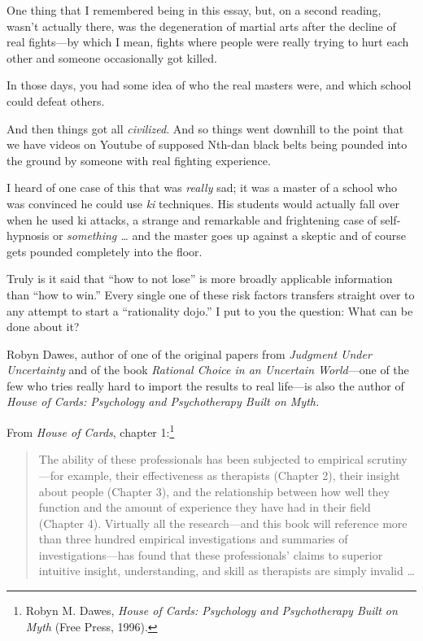 {
 One thing that I remembered being in this essay, but, on a second
reading, wasn't actually there, was the degeneration of
martial arts after the decline of real fights---by which I mean, fights
where people were really trying to hurt each other and someone
occasionally got killed.}

{
 In those days, you had some idea of who the real masters were, and
which school could defeat others.}

{
 And then things got all \textit{civilized}. And so things went
downhill to the point that we have videos on Youtube of supposed
Nth-dan black belts being pounded into the ground by someone with real
fighting experience.}

{
 I heard of one case of this that was \textit{really} sad; it was a
master of a school who was convinced he could use \textit{ki}
techniques. His students would actually fall over when he used ki
attacks, a strange and remarkable and frightening case of self-hypnosis
or \textit{something \ldots} and the master goes up against a skeptic
and of course gets pounded completely into the floor.}

{
 Truly is it said that ``how to not
lose'' is more broadly applicable information than
``how to win.'' Every single one of
these risk factors transfers straight over to any attempt to start a
``rationality dojo.'' I put to you
the question: What can be done about it?}

\myendsectiontext


\bigskip


{
 Robyn Dawes, author of one of the original papers from
\textit{Judgment Under Uncertainty} and of the book \textit{Rational
Choice in an Uncertain World}{}---one of the few who tries really hard
to import the results to real life---is also the author of
\textit{House of Cards: Psychology and Psychotherapy Built on Myth.} }

{
 From \textit{House of Cards}, chapter 1:\footnote{Robyn M. Dawes, \textit{House of Cards: Psychology and
Psychotherapy Built on Myth} (Free Press, 1996).}}

\begin{quote}
{
 The ability of these professionals has been subjected to empirical
scrutiny---for example, their effectiveness as therapists (Chapter 2),
their insight about people (Chapter 3), and the relationship between
how well they function and the amount of experience they have had in
their field (Chapter 4). Virtually all the research---and this book
will reference more than three hundred empirical investigations and
summaries of investigations---has found that these
professionals' claims to superior intuitive insight,
understanding, and skill as therapists are simply invalid \ldots}
\end{quote}

